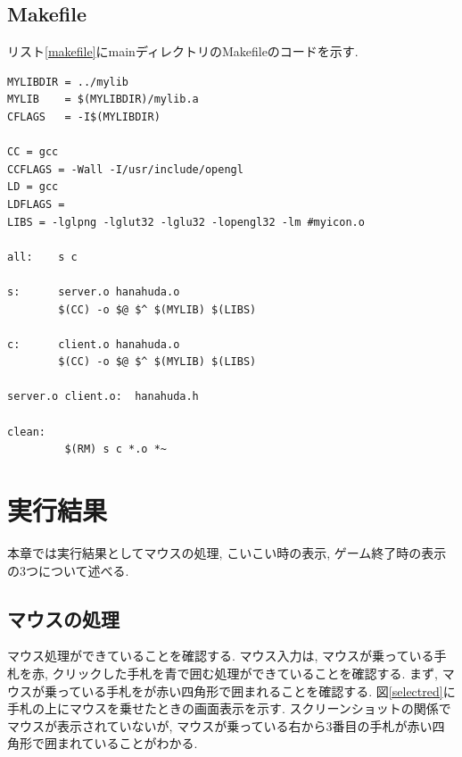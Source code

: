 \documentclass[a4j]{jarticle}
\begin{document}
    \subsection{Makefile}
    リスト\ref{makefile}にmainディレクトリのMakefileのコードを示す.
    \begin{lstlisting}[basicstyle=\ttfamily\footnotesize, frame=single,label=makefile,caption=Makefile]
MYLIBDIR = ../mylib
MYLIB    = $(MYLIBDIR)/mylib.a
CFLAGS   = -I$(MYLIBDIR)

CC = gcc
CCFLAGS = -Wall -I/usr/include/opengl
LD = gcc
LDFLAGS =
LIBS = -lglpng -lglut32 -lglu32 -lopengl32 -lm #myicon.o

all:	s c

s:		server.o hanahuda.o
		$(CC) -o $@ $^ $(MYLIB)	$(LIBS)	

c:		client.o hanahuda.o
		$(CC) -o $@ $^ $(MYLIB) $(LIBS)

server.o client.o:	hanahuda.h

clean:
		 $(RM) s c *.o *~
    \end{lstlisting}

    \section{実行結果}
    本章では実行結果としてマウスの処理, こいこい時の表示, ゲーム終了時の表示の3つについて述べる.
    \subsection{マウスの処理}
    マウス処理ができていることを確認する. マウス入力は, マウスが乗っている手札を赤, クリックした手札を青で囲む処理ができていることを確認する.
    まず, マウスが乗っている手札をが赤い四角形で囲まれることを確認する. 図\ref{selectred}に手札の上にマウスを乗せたときの画面表示を示す. スクリーンショットの関係で
    マウスが表示されていないが, マウスが乗っている右から3番目の手札が赤い四角形で囲まれていることがわかる.
\end{document}
